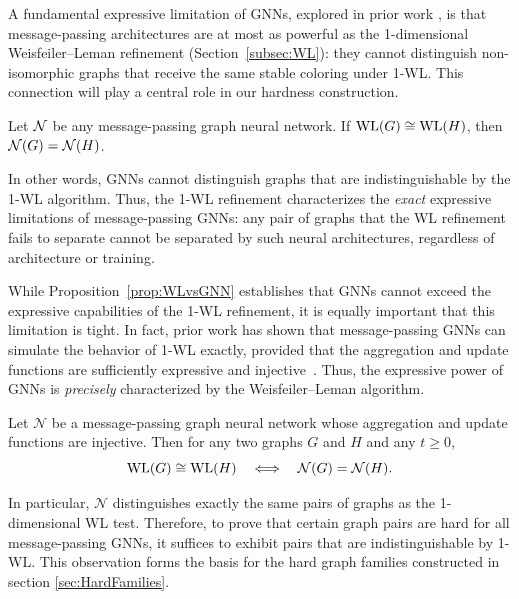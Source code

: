A fundamental expressive limitation of GNNs, explored in prior work
\cite{XuEtAl2019, MorrisEtAl2019}, is that message-passing architectures are at most as powerful as
the 1-dimensional Weisfeiler--Leman refinement (Section~\ref{subsec:WL}):
they cannot distinguish non-isomorphic graphs that receive the same stable coloring under 1-WL.
This connection will play a central role in our hardness construction.

\begin{proposition}
\label{prop:WLvsGNN}
Let $\mathcal{N}$ be any message-passing graph neural network. If $\mathrm{WL}(G) \cong \mathrm{WL}(H)$, then
$\mathcal{N}(G) = \mathcal{N}(H)$.


\end{proposition}

In other words, GNNs cannot distinguish graphs that are indistinguishable by the 1-WL algorithm.
Thus, the 1-WL refinement characterizes the \emph{exact} expressive limitations of message-passing GNNs: any pair of graphs that the WL refinement fails to separate cannot be separated by such neural architectures, regardless of architecture or training.

While Proposition~\ref{prop:WLvsGNN} establishes that GNNs cannot exceed the expressive
capabilities of the 1-WL refinement, it is equally important that this limitation is tight.
In fact, prior work has shown that message-passing GNNs can simulate the behavior of 1-WL
exactly, provided that the aggregation and update functions are sufficiently expressive and
injective~\cite{XuEtAl2019, MorrisEtAl2019}. Thus, the expressive power of GNNs is
\emph{precisely} characterized by the Weisfeiler--Leman algorithm.

\begin{proposition} 
\label{prop:GNN-iff-WL}
Let $\mathcal{N}$ be a message-passing graph neural network whose aggregation and update
functions are injective. Then for any two graphs $G$ and $H$ and any $t \ge 0$,
\[
\mathrm{WL}(G) \cong \mathrm{WL}(H)
\quad\Longleftrightarrow\quad
\mathcal{N}(G) = \mathcal{N}(H).
\]
\end{proposition}
In particular, $\mathcal{N}$ distinguishes exactly the same pairs of graphs as the 1-dimensional WL test.
\noindent
Therefore, to prove that certain graph pairs are hard for all message-passing GNNs, it suffices
to exhibit pairs that are indistinguishable by 1-WL. This observation forms the basis for the
hard graph families constructed in section \ref{sec:HardFamilies}.


